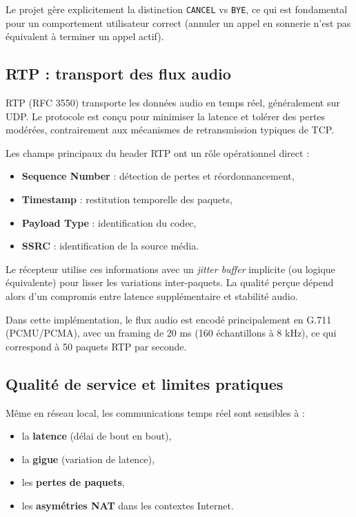 \documentclass[12pt,a4paper]{article}
\begin{document}
Le projet gère explicitement la distinction \texttt{CANCEL} vs \texttt{BYE}, ce qui est fondamental pour un comportement utilisateur correct (annuler un appel en sonnerie n'est pas équivalent à terminer un appel actif).

\subsection{RTP : transport des flux audio}

RTP (RFC 3550) transporte les données audio en temps réel, généralement sur UDP. Le protocole est conçu pour minimiser la latence et tolérer des pertes modérées, contrairement aux mécanismes de retransmission typiques de TCP.

Les champs principaux du header RTP ont un rôle opérationnel direct :
\begin{itemize}[leftmargin=1.2cm]
    \item \textbf{Sequence Number} : détection de pertes et réordonnancement,
    \item \textbf{Timestamp} : restitution temporelle des paquets,
    \item \textbf{Payload Type} : identification du codec,
    \item \textbf{SSRC} : identification de la source média.
\end{itemize}

Le récepteur utilise ces informations avec un \emph{jitter buffer} implicite (ou logique équivalente) pour lisser les variations inter-paquets. La qualité perçue dépend alors d'un compromis entre latence supplémentaire et stabilité audio.

Dans cette implémentation, le flux audio est encodé principalement en G.711 (PCMU/PCMA), avec un framing de 20 ms (160 échantillons à 8 kHz), ce qui correspond à 50 paquets RTP par seconde.

\subsection{Qualité de service et limites pratiques}

Même en réseau local, les communications temps réel sont sensibles à :
\begin{itemize}[leftmargin=1.2cm]
    \item la \textbf{latence} (délai de bout en bout),
    \item la \textbf{gigue} (variation de latence),
    \item les \textbf{pertes de paquets},
    \item les \textbf{asymétries NAT} dans les contextes Internet.
\end{itemize}
\end{document}
